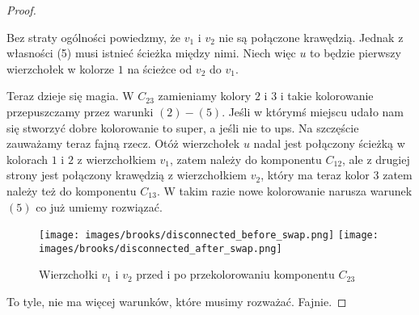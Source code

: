 \begin{proof}
\begin{enumerate}
		      Bez straty ogólności powiedzmy, że \(v_1\) i \(v_2\) nie są połączone krawędzią. Jednak z własności (5) musi istnieć ścieżka między nimi. Niech więc \(u\) to będzie pierwszy wierzchołek w kolorze \(1\) na ścieżce od \(v_2\) do \(v_1\).

		      Teraz dzieje się magia.
		      W \(C_{23}\) zamieniamy kolory \(2\) i \(3\) i takie kolorowanie przepuszczamy przez warunki \((2) - (5)\).
		      Jeśli w którymś miejscu udało nam się stworzyć dobre kolorowanie to super, a jeśli nie to ups.
		      Na szczęście zauważamy teraz fajną rzecz. Otóż wierzchołek \(u\) nadal jest połączony ścieżką w kolorach \(1\) i \(2\) z wierzchołkiem \(v_1\), zatem należy do komponentu \(C_{12}\), ale z drugiej strony jest połączony krawędzią z wierzchołkiem \(v_2\), który ma teraz kolor \(3\) zatem należy też do komponentu \(C_{13}\).
		      W takim razie nowe kolorowanie narusza warunek \((5)\) co już umiemy rozwiązać.

		      \begin{figure}[H]
			      \centering
			      \texttt{[image: images/brooks/disconnected\_before\_swap.png]}
			      \texttt{[image: images/brooks/disconnected\_after\_swap.png]}
			      \caption{Wierzchołki \(v_1\) i \(v_2\) przed i po przekolorowaniu komponentu \(C_{23}\)}
		      \end{figure}


	\end{enumerate}

	To tyle, nie ma więcej warunków, które musimy rozważać. Fajnie.

\end{proof}
